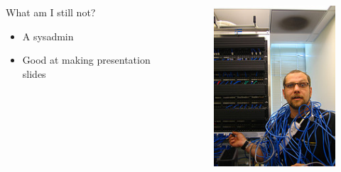 \documentclass{beamer}
\begin{document}
\begin{frame}
    \begin{columns}
        \begin{column}{0.5\textwidth}
            What am I still not?
            \begin{itemize}
                \item A sysadmin
                \item Good at making presentation slides
            \end{itemize}
        \end{column}
        \begin{column}{0.5\textwidth}
            \begin{figure}
                \centering
                \includegraphics[width=\textwidth,keepaspectratio]{../resources/sysadmin.jpg}
            \end{figure}
        \end{column}
    \end{columns}
\end{frame}
\end{document}
